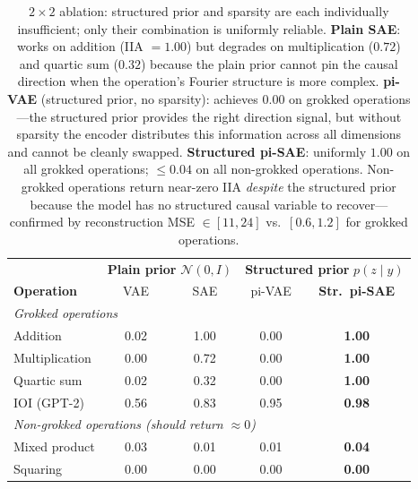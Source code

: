 \begin{table}[t]
\centering
\small
\setlength{\tabcolsep}{4pt}
\begin{tabular}{@{}l|cc|cc@{}}
\toprule
& \multicolumn{2}{c|}{\textbf{Plain prior} $\mathcal{N}(0,I)$}
& \multicolumn{2}{c}{\textbf{Structured prior} $p(z \mid y)$} \\
\textbf{Operation} & VAE & SAE & pi-VAE & \textbf{Str.\ pi-SAE} \\
\midrule
\multicolumn{5}{l}{\textit{Grokked operations}} \\
Addition         & 0.02 & 1.00 & 0.00 & \textbf{1.00} \\
Multiplication   & 0.00 & 0.72 & 0.00 & \textbf{1.00} \\
Quartic sum      & 0.02 & 0.32 & 0.00 & \textbf{1.00} \\
IOI (GPT-2)      & 0.56 & 0.83 & 0.95 & \textbf{0.98} \\
\midrule
\multicolumn{5}{l}{\textit{Non-grokked operations (should return $\approx 0$)}} \\
Mixed product    & 0.03 & 0.01 & 0.01 & \textbf{0.04} \\
Squaring         & 0.00 & 0.00 & 0.00 & \textbf{0.00} \\
\bottomrule
\end{tabular}
\caption{$2 \times 2$ ablation: structured prior and sparsity are each
individually insufficient; only their combination is uniformly reliable.
\textbf{Plain SAE}: works on addition (IIA $= 1.00$) but degrades on
multiplication ($0.72$) and quartic sum ($0.32$) because the plain prior
cannot pin the causal direction when the operation's Fourier structure is
more complex.  \textbf{pi-VAE} (structured prior, no sparsity): achieves
$0.00$ on grokked operations---the structured prior provides the right
direction signal, but without sparsity the encoder distributes this
information across all dimensions and cannot be cleanly swapped.
\textbf{Structured pi-SAE}: uniformly $1.00$ on all grokked operations;
$\leq 0.04$ on all non-grokked operations.  Non-grokked operations return
near-zero IIA \emph{despite} the structured prior because the model has no
structured causal variable to recover---confirmed by reconstruction MSE
$\in [11, 24]$ vs.\ $[0.6, 1.2]$ for grokked operations.}
\label{tab:2x2_ablation}
\end{table}

